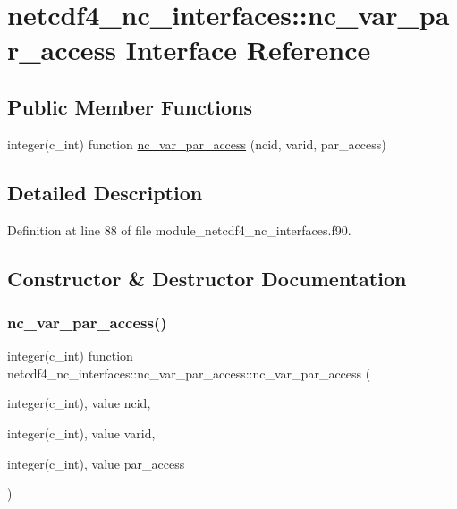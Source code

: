 \hypertarget{interfacenetcdf4__nc__interfaces_1_1nc__var__par__access}{}\section{netcdf4\+\_\+nc\+\_\+interfaces\+:\+:nc\+\_\+var\+\_\+par\+\_\+access Interface Reference}
\label{interfacenetcdf4__nc__interfaces_1_1nc__var__par__access}
\subsection*{Public Member Functions}
\begin{DoxyCompactItemize}
\item 
integer(c\+\_\+int) function \hyperlink{interfacenetcdf4__nc__interfaces_1_1nc__var__par__access_a6b5d6054407f9bf6782bbde735434193}{nc\+\_\+var\+\_\+par\+\_\+access} (ncid, varid, par\+\_\+access)
\end{DoxyCompactItemize}


\subsection{Detailed Description}


Definition at line 88 of file module\+\_\+netcdf4\+\_\+nc\+\_\+interfaces.\+f90.



\subsection{Constructor \& Destructor Documentation}
\mbox{\label{interfacenetcdf4__nc__interfaces_1_1nc__var__par__access_a6b5d6054407f9bf6782bbde735434193}} 
\subsubsection{\texorpdfstring{nc\+\_\+var\+\_\+par\+\_\+access()}{nc\_var\_par\_access()}}
{\footnotesize\ttfamily integer(c\+\_\+int) function netcdf4\+\_\+nc\+\_\+interfaces\+::nc\+\_\+var\+\_\+par\+\_\+access\+::nc\+\_\+var\+\_\+par\+\_\+access (\begin{DoxyParamCaption}\item[{integer(c\+\_\+int), value}]{ncid,  }\item[{integer(c\+\_\+int), value}]{varid,  }\item[{integer(c\+\_\+int), value}]{par\+\_\+access }\end{DoxyParamCaption})}



